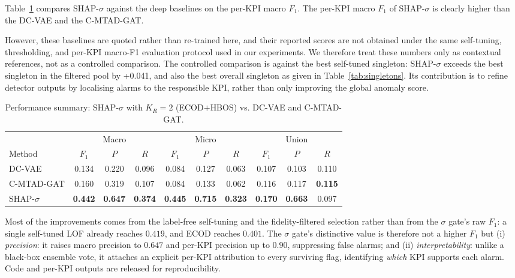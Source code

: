 \documentclass[conference]{IEEEtran}
\begin{document}
Table~\ref{tab:summary} compares SHAP-$\sigma$ against the deep baselines on the per-KPI macro $F_1$. The per-KPI macro $F_1$ of SHAP-$\sigma$ is clearly higher than the DC-VAE and the C-MTAD-GAT. 

However, these baselines are quoted rather than re-trained here, and their reported scores are not obtained under the same self-tuning, thresholding, and per-KPI macro-F1 evaluation protocol used in our experiments. We therefore treat these numbers only as contextual references, not as a controlled comparison. The controlled comparison is against the best self-tuned singleton: SHAP-$\sigma$ exceeds the best singleton in the filtered pool by +0.041, and also the best overall singleton as given in Table~\ref{tab:singletons}. Its contribution is to refine detector outputs by localising alarms to the responsible KPI, rather than only improving the global anomaly score.

\begin{table}[t]
  \centering
  \caption{Performance summary: SHAP-$\sigma$ with $K_R=2$ (ECOD$+$HBOS) vs. DC-VAE and C-MTAD-GAT.}
  \label{tab:summary}
  \scriptsize
  \setlength{\tabcolsep}{2.5pt}
  \renewcommand{\arraystretch}{1.1}
  \begin{tabular}{lccccccccc}
  \toprule
  & \multicolumn{3}{c}{Macro} 
  & \multicolumn{3}{c}{Micro} 
  & \multicolumn{3}{c}{Union} \\
  \cmidrule(lr){2-4}\cmidrule(lr){5-7}\cmidrule(lr){8-10}
  Method & $F_1$ & $P$ & $R$ & $F_1$ & $P$ & $R$ & $F_1$ & $P$ & $R$ \\
  \midrule
  DC-VAE 
  & 0.134 & 0.220 & 0.096
  & 0.084 & 0.127 & 0.063
  & 0.107 & 0.103 & 0.110 \\

  C-MTAD-GAT
  & 0.160 & 0.319 & 0.107
  & 0.084 & 0.133 & 0.062
  & 0.116 & 0.117 & \textbf{0.115} \\

  SHAP-$\sigma$
  & \textbf{0.442} & \textbf{0.647} & \textbf{0.374}
  & \textbf{0.445} & \textbf{0.715} & \textbf{0.323}
  & \textbf{0.170} & \textbf{0.663} & 0.097 \\
  \bottomrule
  \end{tabular}
\end{table}






Most of the improvements comes from the label-free self-tuning and the fidelity-filtered selection rather than from the $\sigma$ gate's raw $F_1$: a single self-tuned LOF already reaches $0.419$, and ECOD
reaches $0.401$. The $\sigma$ gate's distinctive value is therefore not a
higher $F_1$ but (i) \emph{precision}: it raises macro precision to
$0.647$ and per-KPI precision up to $0.90$, suppressing false alarms; and
(ii) \emph{interpretability}: unlike a black-box ensemble vote, it
attaches an explicit per-KPI attribution to every surviving flag,
identifying \emph{which} KPI supports each alarm. Code and per-KPI
outputs are released for reproducibility.
\end{document}
